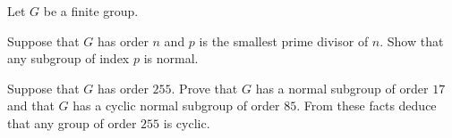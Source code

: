 Let $G$ be a finite group.
\begin{alist}
\item Suppose that $G$ has order $n$ and $p$ is the smallest prime 
divisor of $n$. Show that any subgroup of index $p$ is normal.
\item Suppose that $G$ has order $255$. Prove that $G$ has a normal
subgroup of order $17$ and that $G$ has a cyclic normal subgroup of
order $85$. From these facts deduce that any group of order $255$ is
cyclic.
\end{alist}

